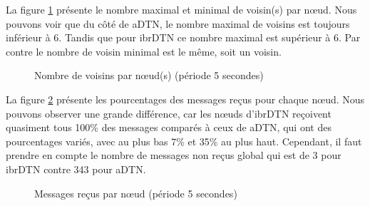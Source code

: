 \documentclass[a4paper,10pt]{article}
\begin{document}
La figure \ref{fig:05_nb_neighbors} présente le nombre maximal et minimal de voisin(s) par nœud. Nous pouvons voir que du côté de aDTN, le nombre maximal de voisins est toujours inférieur à 6. Tandis que pour ibrDTN ce nombre maximal est supérieur à 6. Par contre le nombre de voisin minimal est le même, soit un voisin.\par

\begin{figure}[h!]
    \centering
    \caption{Nombre de voisins par nœud(s) (période 5 secondes)}
    \label{fig:05_nb_neighbors}
\end{figure}

La figure \ref{fig:05_msg_rcv} présente les pourcentages des messages reçus pour chaque nœud. Nous pouvons observer une grande différence, car les nœuds d’ibrDTN reçoivent quasiment tous 100\% des messages comparés à ceux de aDTN, qui ont des pourcentages variés, avec au plus bas 7\% et 35\% au plus haut. Cependant, il faut prendre en compte le nombre de messages non reçus global qui est de 3 pour ibrDTN contre 343 pour aDTN.\par

\begin{figure}[h!]
    \centering
    \caption{Messages reçus par nœud (période 5 secondes)}
    \label{fig:05_msg_rcv}
\end{figure}
\end{document}
